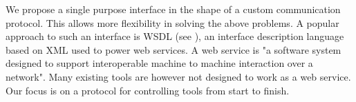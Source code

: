 \documentclass{article}
\newcommand{\squadt}{SQuADT\xspace}
\begin{document}
  
  
  We propose a single purpose interface in the shape of a custom communication
  protocol. This allows more flexibility in solving the above problems. A
  popular approach to such an interface is WSDL (see \cite{2001-WSDL}), an
  interface description language based on XML used to power web services.  A
  web service is "a software system designed to support interoperable machine
  to machine interaction over a network". Many existing tools are however not
  designed to work as a web service.  Our focus is on a protocol for
  controlling tools from start to finish.

\end{document}
